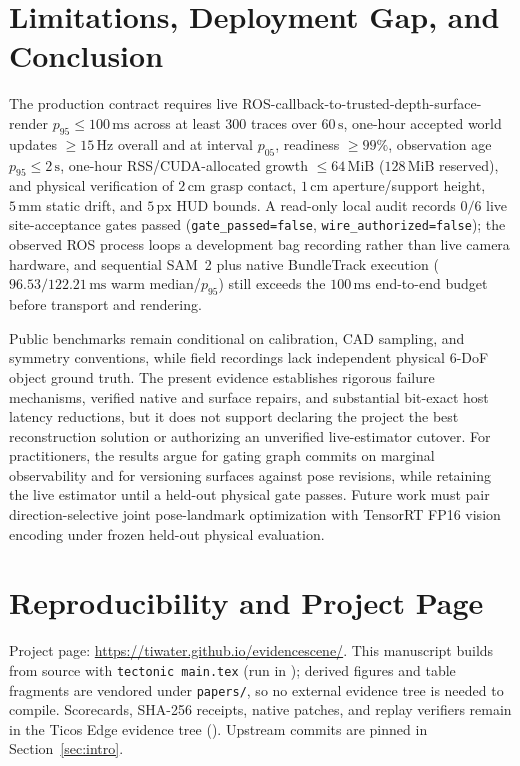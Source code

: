 \documentclass[10pt,journal]{IEEEtran}
\begin{document}
\section{Limitations, Deployment Gap, and Conclusion}
\label{sec:limitations}

The production contract requires live ROS-callback-to-trusted-depth-surface-render $p_{95}\le 100\,\mathrm{ms}$ across at least $300$ traces over $60\,\mathrm{s}$, one-hour accepted world updates $\ge 15\,\mathrm{Hz}$ overall and at interval $p_{05}$, readiness $\ge 99\%$, observation age $p_{95}\le 2\,\mathrm{s}$, one-hour RSS/CUDA-allocated growth $\le 64\,\mathrm{MiB}$ ($128\,\mathrm{MiB}$ reserved), and physical verification of $2\,\mathrm{cm}$ grasp contact, $1\,\mathrm{cm}$ aperture/support height, $5\,\mathrm{mm}$ static drift, and $5\,\mathrm{px}$ HUD bounds. A read-only local audit records $0/6$ live site-acceptance gates passed (\texttt{gate\_passed=false}, \texttt{wire\_authorized=false}); the observed ROS process loops a development bag recording rather than live camera hardware, and sequential SAM~2 plus native BundleTrack execution ($96.53/122.21\,\mathrm{ms}$ warm median/$p_{95}$) still exceeds the $100\,\mathrm{ms}$ end-to-end budget before transport and rendering.

Public benchmarks remain conditional on calibration, CAD sampling, and symmetry conventions, while field recordings lack independent physical 6-DoF object ground truth. The present evidence establishes rigorous failure mechanisms, verified native and surface repairs, and substantial bit-exact host latency reductions, but it does not support declaring the project the best reconstruction solution or authorizing an unverified live-estimator cutover. For practitioners, the results argue for gating graph commits on marginal observability and for versioning surfaces against pose revisions, while retaining the live estimator until a held-out physical gate passes. Future work must pair direction-selective joint pose-landmark optimization with TensorRT FP16 vision encoding under frozen held-out physical evaluation.

\section*{Reproducibility and Project Page}
Project page: \url{https://tiwater.github.io/evidencescene/}. This manuscript builds from source with \texttt{tectonic main.tex} (run in ); derived figures and table fragments are vendored under \texttt{papers/}, so no external evidence tree is needed to compile. Scorecards, SHA-256 receipts, native patches, and replay verifiers remain in the Ticos Edge evidence tree (). Upstream commits are pinned in Section~\ref{sec:intro}.
\end{document}
